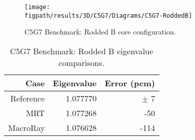 {{{{        \begin{figure}[htbp]
          \centering
          \texttt{[image: \\figpath/results/3D/C5G7/Diagrams/C5G7-RoddedB]}
          \caption{C5G7 Benchmark: Rodded B core configuration. \label{fig:MR:C5G7:Rodded B}}
        \end{figure}

        \begin{table}[htbp]
          \centering
          \caption{C5G7 Benchmark: Rodded B eigenvalue comparisons. \label{tab:MR:C5G7:Rodded B-Eigenvalues}}
          \begin{tabular}{rrr}\toprule
            Case & Eigenvalue & Error (pcm)\\\midrule
            Reference & 1.077770 & $\pm$ 7\\
            MRT       & 1.077268  & -50\\
            MacroRay  & 1.076628 & -114\\\bottomrule
          \end{tabular}
        \end{table}

}}}}

